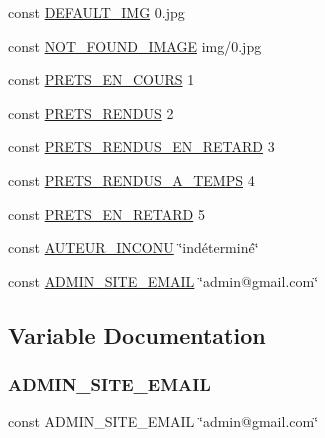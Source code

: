 \begin{DoxyCompactItemize}
\item 
const \hyperlink{__config_8inc_8php_aa21b5f0a30fd2244b1582e8b845d1325}{D\+E\+F\+A\+U\+L\+T\+\_\+\+I\+MG} \textquotesingle{}0.jpg\textquotesingle{}
\item 
const \hyperlink{__config_8inc_8php_a480a19398b3197b77c279dda31b8d8cc}{N\+O\+T\+\_\+\+F\+O\+U\+N\+D\+\_\+\+I\+M\+A\+GE} \textquotesingle{}img/0.jpg\textquotesingle{}
\item 
const \hyperlink{__config_8inc_8php_ad897ad8bf73453380fbf338d89c2e479}{P\+R\+E\+T\+S\+\_\+\+E\+N\+\_\+\+C\+O\+U\+RS} 1
\item 
const \hyperlink{__config_8inc_8php_aab35e53bd722f568ba23f654a71c5b50}{P\+R\+E\+T\+S\+\_\+\+R\+E\+N\+D\+US} 2
\item 
const \hyperlink{__config_8inc_8php_a78f0d237731cef9b73a905acffe48df9}{P\+R\+E\+T\+S\+\_\+\+R\+E\+N\+D\+U\+S\+\_\+\+E\+N\+\_\+\+R\+E\+T\+A\+RD} 3
\item 
const \hyperlink{__config_8inc_8php_a1a4c287f13214ee0ae1ead0c49fd0d37}{P\+R\+E\+T\+S\+\_\+\+R\+E\+N\+D\+U\+S\+\_\+\+A\+\_\+\+T\+E\+M\+PS} 4
\item 
const \hyperlink{__config_8inc_8php_af863243b4dea8bf231598b0a88ab1eed}{P\+R\+E\+T\+S\+\_\+\+E\+N\+\_\+\+R\+E\+T\+A\+RD} 5
\item 
const \hyperlink{__config_8inc_8php_a36d6f5580c566eb32d0b481477a86daf}{A\+U\+T\+E\+U\+R\+\_\+\+I\+N\+C\+O\+NU} \char`\"{}indéterminé\char`\"{}
\item 
const \hyperlink{__config_8inc_8php_a027b2e8c828c50d1ad89e469f41b8e05}{A\+D\+M\+I\+N\+\_\+\+S\+I\+T\+E\+\_\+\+E\+M\+A\+IL} \char`\"{}admin@gmail.\+com\char`\"{}
\end{DoxyCompactItemize}


\subsection{Variable Documentation}
\mbox{\label{__config_8inc_8php_a027b2e8c828c50d1ad89e469f41b8e05}} 
\subsubsection{\texorpdfstring{A\+D\+M\+I\+N\+\_\+\+S\+I\+T\+E\+\_\+\+E\+M\+A\+IL}{ADMIN\_SITE\_EMAIL}}
{\footnotesize\ttfamily const A\+D\+M\+I\+N\+\_\+\+S\+I\+T\+E\+\_\+\+E\+M\+A\+IL \char`\"{}admin@gmail.\+com\char`\"{}}



